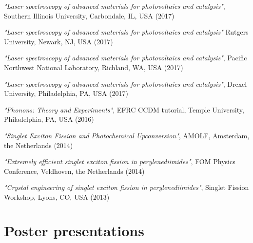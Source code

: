 \documentclass[11pt,letterpaper,sans]{moderncv} %
\begin{document}
\begin{etaremune}
	\item \emph{"Laser spectroscopy of advanced materials for photovoltaics and catalysis"},
	      Southern Illinois University, Carbondale, IL, USA (2017)
	\item \emph{"Laser spectroscopy of advanced materials for photovoltaics and catalysis"}
	      Rutgers University, Newark, NJ, USA (2017)
	\item \emph{"Laser spectroscopy of advanced materials for photovoltaics and catalysis"},
	      Pacific Northwest National Laboratory, Richland, WA, USA (2017)
	\item \emph{"Laser spectroscopy of advanced materials for photovoltaics and catalysis"},
	      Drexel University, Philadelphia, PA, USA (2017)
	\item \emph{"Phonons: Theory and Experiments"}, EFRC CCDM tutorial, Temple University,
	      Philadelphia, PA, USA (2016)
	\item \emph{"Singlet Exciton Fission and Photochemical Upconversion"},
	      AMOLF, Amsterdam, the Netherlands (2014)
	\item \emph{"Extremely efficient singlet exciton fission in perylenediimides"},
	      FOM Physics Conference, Veldhoven, the Netherlands (2014)
	\item \emph{"Crystal engineering of singlet exciton fission in perylenediimides"}, 
	      Singlet Fission Workshop, Lyons, CO, USA (2013)
\end{etaremune}





\section {Poster presentations}
\end{document}
